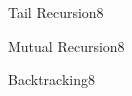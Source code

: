 \documentclass[a4paper]{article}
\begin{document}
\header


\begin{problem}{Tail Recursion}{8}
\end{problem}

\begin{problem}{Mutual Recursion}{8}
\end{problem}

\begin{problem}{Backtracking}{8}
\end{problem}
\end{document}
